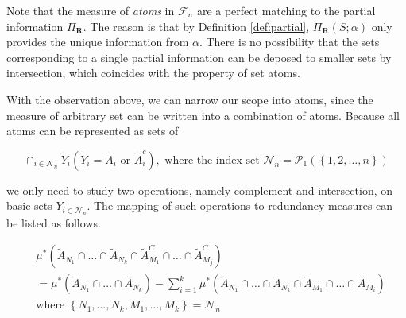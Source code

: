 


Note that the measure of \textit{atoms} in $\mathcal{F}_n$ are a perfect matching to the partial information $\Pi_{\mathbf{R}}$. The reason is that by Definition \ref{def:partial}, $\Pi_\mathbf{R}\left(S;\alpha\right)$ only provides the unique information from $\alpha$. There is no possibility that the sets corresponding to a single partial information can be deposed to smaller sets by intersection, which coincides with the property of set atoms.

With the observation above, we can narrow our scope into atoms, since the measure of arbitrary set can be written into a combination of atoms. Because all atoms can be represented as sets of 

\begin{equation}
    \cap _{i\in\mathcal{N}_n} \tilde{Y}_i (\tilde{Y}_i = \tilde{A}_i \text{ or } \tilde{A}_i^c), \text{ where the index set } \mathcal{N}_n = \mathcal{P}_1\left(\left\{ 1,2,\ldots,n\right\}\right)
\end{equation}

we only need to study two operations, namely complement and intersection,  on basic sets $Y_{i \in \mathcal{N}_n}$. The mapping of such operations to redundancy measures can be listed as follows.

\begin{align}
    & \mu^{*}\left( \tilde{A}_{N_1} \cap \ldots \cap \tilde{A}_{N_k} \cap \tilde{A}_{M_1}^{C} \cap \ldots\cap \tilde{A}_{M_j}^{C} \right) \\
    &= \mu^{*}\left(\tilde{A}_{N_1} \cap \ldots \cap \tilde{A}_{N_k} \right) - \sum_{i=1}^{k} \mu^{*} \left( \tilde{A}_{N_1} \cap \ldots \cap \tilde{A}_{N_k} \cap\tilde{A}_{M_1} \cap \ldots \cap \tilde{A}_{M_i} \right) \label{eqn:simplify} \\  
    & \text{where } \left\{ N_1, \ldots, N_k, M_1, \ldots, M_k \right\} = \mathcal{N}_n \label{eqn:idxsetatom}
\end{align}

